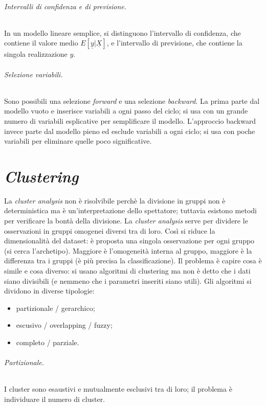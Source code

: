 \documentclass[11pt, a4page, twocolumn]{article}
\begin{document}
\paragraph{Intervalli di confidenza e di previsione.}
In un modello lineare semplice, si distinguono l'intervallo di confidenza, che contiene il valore medio $E[\underline{y} | \underline{X}]$, e l'intervallo di previsione, che contiene la singola realizzazione $y$.

\paragraph{Selezione variabili.}
Sono possibili una selezione \textit{forward} e una selezione \textit{backward}.
La prima parte dal modello vuoto e inserisce variabili a ogni passo del ciclo; si usa con un grande numero di variabili esplicative per semplificare il modello.
L'approccio backward invece parte dal modello pieno ed esclude variabili a ogni ciclo; si usa con poche variabili per eliminare quelle poco significative.



\newpage
\part{\textit{Clustering}}
La \textit{cluster analysis} non è risolvibile perchè la divisione in gruppi non è deterministica ma è un'interpretazione dello spettatore; tuttavia esistono metodi per verificare la bontà della divisione.
La \textit{cluster analysis} serve per dividere le osservazioni in gruppi omogenei diversi tra di loro.
Così si riduce la dimensionalità del dataset: è proposta una singola osservazione per ogni gruppo (si cerca l'archetipo).
Maggiore è l'omogeneità interna al gruppo, maggiore è la differenza tra i gruppi (è più precisa la classificazione). \newline
Il problema è capire cosa è simile e cosa diverso: si usano algoritmi di clustering ma non è detto che i dati siano divisibili (e nemmeno che i parametri inseriti siano utili).
Gli algoritmi si dividono in diverse tipologie:
\begin{itemize}
\item partizionale / gerarchico;
\item escusivo / overlapping / fuzzy;
\item completo / parziale.
\end{itemize}
\paragraph{Partizionale.}
I cluster sono esaustivi e mutualmente esclusivi tra di loro; il problema è individuare il numero di cluster.
\end{document}

